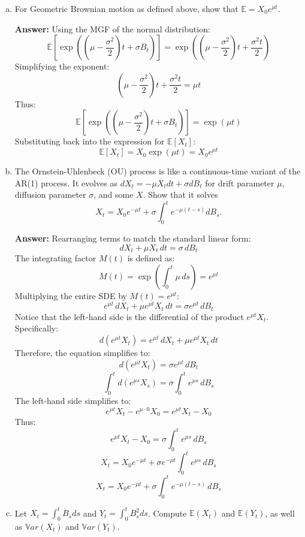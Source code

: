 \documentclass[11pt]{extarticle}
\theoremstyle{plain}
\theoremstyle{definition}
\begin{document}
\begin{enumerate}[(a)]
\item For Geometric Brownian motion as defined above, show that $\mathbb E = X_0 e^{\mu t}$.

\textbf{Answer:} Using the MGF of the normal distribution:
\[
\mathbb{E}\left[ \exp\left( \left( \mu - \frac{\sigma^2}{2} \right) t + \sigma B_t \right) \right] = \exp\left( \left( \mu - \frac{\sigma^2}{2} \right) t + \frac{\sigma^2 t}{2} \right)
\]
Simplifying the exponent:
\[
\left( \mu - \frac{\sigma^2}{2} \right) t + \frac{\sigma^2 t}{2} = \mu t
\]
Thus:
\[
\mathbb{E}\left[ \exp\left( \left( \mu - \frac{\sigma^2}{2} \right) t + \sigma B_t \right) \right] = \exp\left( \mu t \right)
\]
Substituting back into the expression for \( \mathbb{E}[X_t] \):
\[
\mathbb{E}[X_t] = X_0 \exp\left( \mu t \right) = X_0 e^{\mu t}
\]

\item The Ornstein-Uhlenbeck (OU) process is like a continuous-time variant of the AR(1) process. It evolves as $dX_t = - \mu X_t dt + \sigma dB_t$ for drift parameter $\mu$, diffusion parameter $\sigma$, and some $X$. Show that it solves 
\begin{equation*}
	X_t = X_0 e^{- \mu t} + \sigma \int_0^t e^{-\mu(t - s)} dB_s.
\end{equation*}

\textbf{Answer:} Rearranging terms to match the standard linear form:
\[
dX_t + \mu X_t \, dt = \sigma \, dB_t
\]
The integrating factor \( M(t) \) is defined as:
\[
M(t) = \exp\left( \int_{0}^{t} \mu \, ds \right) = e^{\mu t}
\]
Multiplying the entire SDE by \( M(t) = e^{\mu t} \):
\[
e^{\mu t} \, dX_t + \mu e^{\mu t} X_t \, dt = \sigma e^{\mu t} \, dB_t
\]
Notice that the left-hand side is the differential of the product \( e^{\mu t} X_t \). Specifically:
\[
d\left( e^{\mu t} X_t \right) = e^{\mu t} \, dX_t + \mu e^{\mu t} X_t \, dt
\]
Therefore, the equation simplifies to:
\[
d\left( e^{\mu t} X_t \right) = \sigma e^{\mu t} \, dB_t
\]
\[
\int_{0}^{t} d\left( e^{\mu s} X_s \right) = \sigma \int_{0}^{t} e^{\mu s} \, dB_s
\]
The left-hand side simplifies to:
\[
e^{\mu t} X_t - e^{\mu \cdot 0} X_0 = e^{\mu t} X_t - X_0
\]
Thus:
\[
e^{\mu t} X_t - X_0 = \sigma \int_{0}^{t} e^{\mu s} \, dB_s
\]
\[
X_t = X_0 e^{-\mu t} + \sigma e^{-\mu t} \int_{0}^{t} e^{\mu s} \, dB_s
\]
\[
X_t = X_0 e^{-\mu t} + \sigma \int_{0}^{t} e^{-\mu (t - s)} \, dB_s
\]

\item Let $X_t = \int_0^t B_s ds$ and $Y_t = \int_0^t B_s^2 ds$. Compute $\mathbb E(X_t)$ and $\mathbb E(Y_t)$, as well as $\mathbb Var(X_t)$ and $\mathbb Var(Y_t)$. 


\end{enumerate}
\end{document}

